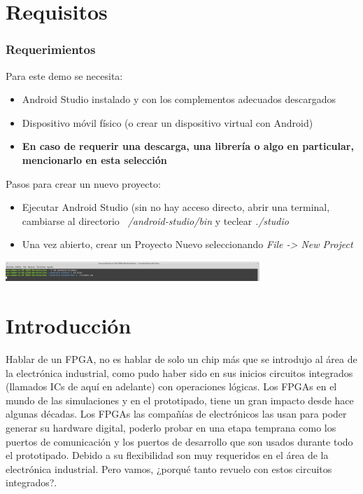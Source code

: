 \section{Requisitos}
\begin{frame}
  \frametitle{Requerimientos}
  {\small 
	Para este demo se necesita:
    \begin{itemize}
    \item Android Studio instalado y con los complementos adecuados descargados
    \item Dispositivo móvil físico (o  crear un dispositivo virtual con Android)
    \item \textbf{En caso de requerir una descarga, una librería o algo en particular, mencionarlo en esta selección}
    \end{itemize}

    Pasos para crear un nuevo proyecto:
    \begin{itemize}
    \item Ejecutar Android Studio (sin no hay acceso directo, abrir una terminal, cambiarse al directorio \textit{~/android-studio/bin} y teclear \textit{./studio}
    \item Una vez abierto, crear un Proyecto Nuevo seleccionando \textit{File -> New Project}
    \end{itemize}
	\begin{center}
	\includegraphics[height=0.75cm]{graphics/AndroidStudioSimboloSistema}
	\end{center}	
  }
  
\end{frame}

\section{Introducción}
\begin{frame}
Hablar de un FPGA, no es hablar de solo un chip más que se introdujo al área de la electrónica industrial, como pudo haber sido en sus inicios circuitos integrados (llamados ICs de aquí en adelante) con operaciones lógicas. Los FPGAs en el mundo de las simulaciones y en el prototipado, tiene un gran impacto desde hace algunas décadas. Los FPGAs las compañías de electrónicos las usan para poder generar su hardware digital, poderlo probar en una etapa temprana como los puertos de comunicación y los puertos de desarrollo que son usados durante todo el prototipado. Debido a su flexibilidad son muy requeridos en el área de la electrónica industrial. Pero vamos, ¿porqué tanto revuelo con estos circuitos integrados?. 
\end{frame}




